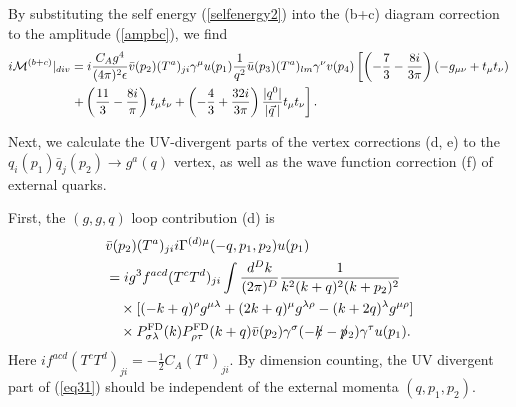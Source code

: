 \documentclass[preprint,amsmath,amssymb,superscriptaddress, floatfix,nofootinbib]{revtex4}
\def\psla{p\kern-.45em/}
\def\ksla{k\kern-.45em/}
\begin{document}
By substituting the self energy (\ref{selfenergy2}) 
into the (b+c) diagram correction to the amplitude (\ref{ampbc}), 
we find 
%
\begin{align}
i{\cal M}^{(b+c)}|_{div} & = 
i\frac{C_A g^4}{(4\pi)^2\epsilon}
\bar{v}(p_2)(T^a)_{ji} \gamma^{\mu}u(p_1) \frac{1}{q^2}
\bar{u}(p_3)(T^a)_{lm}\gamma^{\nu} v(p_4) 
\left[ \left( -\frac{7}{3} -\frac{8i}{3\pi}\right) (-g_{\mu\nu}+t_{\mu}t_{\nu}) 
\right. 
\nonumber \\
& \left. + \left( \frac{11}{3}-\frac{8i}{\pi} \right) t_{\mu}t_{\nu} 
+\left(-\frac{4}{3}+\frac{32i}{3\pi} \right) \frac{|q^0|}{|\vec{q}\,|} 
t_{\mu}t_{\nu} \right] .  
\label{dmself}
\end{align}

Next, we calculate 
the UV-divergent parts of the vertex corrections (d, e) to the 
$q_i(p_1)\bar{q}_j(p_2)\to g^a(q)$ vertex, as well as the 
wave function correction (f) of external quarks. 

First, the $(g,g,q)$ loop contribution (d) is 
\begin{align}
& \bar{v}(p_2)(T^a)_{ji}i\Gamma^{(d)\mu}(-q,p_1,p_2)u(p_1)   
\nonumber \\
& =  
i g^3 f^{acd} (T^c T^d)_{ji} 
\int \frac{d^D k}{(2\pi)^D} \frac{1}{ k^2 (k+q)^2(k+p_2)^2}
\nonumber \\
&\quad \times [ (-k+q)^{\rho}g^{\mu\lambda} +(2k+q)^{\mu}g^{\lambda\rho}
-(k+2q)^{\lambda}g^{\mu\rho} ] 
\nonumber \\
&\quad \times P^{{\rm FD}}_{\sigma\lambda}(k)P^{{\rm FD}}_{\rho\tau}(k+q)
\bar{v}(p_2)\gamma^{\sigma}(-\ksla-\psla_2) \gamma^{\tau}
u(p_1) . \label{eq31}
\end{align}
Here $if^{acd}(T^c T^d)_{ji}=-\frac{1}{2}C_A(T^a)_{ji}$. 
%
By dimension counting, 
the UV divergent part of (\ref{eq31}) should be independent of 
the external momenta $(q,p_1,p_2)$. 
\end{document}
